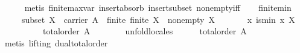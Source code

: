 \begin{isabellebody}
%
\isadelimproof
\ \ \ \ %
\endisadelimproof
%
\isatagproof
{}\isamarkupfalse%
\ {}metis\ finite{}max{}var\ insert{}absorb{}\ insert{}subset\ nonempty{}iff{}%
\endisatagproof
{\isafoldproof}%
%
\isadelimproof
\isanewline
%
\endisadelimproof
\isanewline
\ \ \isamarkupfalse%
\ finite{}min{}\isanewline
\ \ \ \ \ subset{}\ {}X\ {}\ carrier\ A{}\ \ finite{}\ {}finite\ X{}\ \ non{}empty{}\ {}X\ {}\ {}{}{}\isanewline
\ \ \ \ \ {}{}x{}\ is{}min\ x\ X{}\isanewline
%
\isadelimproof
\ \ %
\endisadelimproof
%
\isatagproof
{}\isamarkupfalse%
\ {}\isanewline
\ \ \ \ \isamarkupfalse%
\ {}total{}order\ A{}\isanewline
\ \ \ \ \ \ \isamarkupfalse%
\ unfold{}locales\isanewline
\ \ \ \ \isamarkupfalse%
\ {}total{}order\ {}A{}{}{}\isanewline
\ \ \ \ \ \ \isamarkupfalse%
\ {}metis\ {}lifting{}\ dual{}total{}order{}\isanewline

\end{isabellebody}
